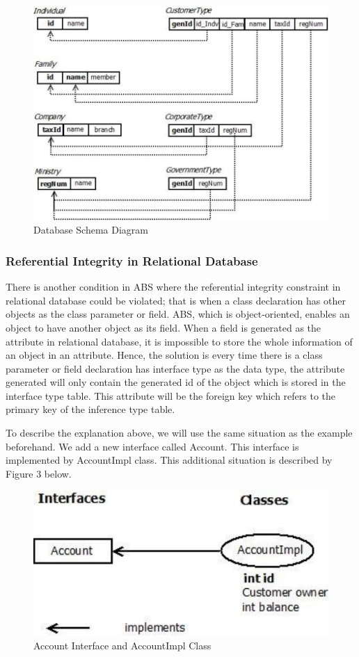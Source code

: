 \documentclass[conference]{IEEEtran}
\begin{document}
\begin{figure}
	\centering
	\includegraphics[scale=0.5]{db1.pdf}
	\caption{Database Schema Diagram}
	\label{figure2}
\end{figure}

\subsubsection{Referential Integrity in Relational Database}
There is another condition in ABS where the referential integrity constraint in relational database could be violated; that is when a class declaration has other objects as the class parameter or field. ABS, which is object-oriented, enables an object to have another object as its field. When a field is generated as the attribute in relational database, it is impossible to store the whole information of an object in an attribute. Hence, the solution is every time there is a class parameter or field declaration has interface type as the data type, the attribute generated will only contain the generated id of the object which is stored in the interface type table. This attribute will be the foreign key which refers to the primary key of the inference type table.

To describe the explanation above, we will use the same situation as the example beforehand. We add a new interface called Account. This interface is implemented by AccountImpl class. This additional situation is described by Figure 3 below.

\begin{figure}
	\centering
	\includegraphics[scale=0.6]{sample2.pdf}
	\caption{Account Interface and AccountImpl Class}
	\label{figure3}	
\end{figure}
\end{document}
